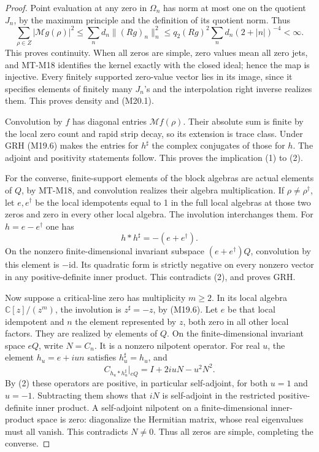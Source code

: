 \begin{proof}
Point evaluation at any zero in \(\Omega_n\) has norm at
most one on the quotient \(J_n\), by the maximum principle
and the definition of its quotient norm. Thus
\[
 \sum_{\rho\in Z}|\mathcal Mg(\rho)|^2
 \le\sum_n d_n\|(Rg)_n\|_n^2
 \le q_2(Rg)^2\sum_n d_n(2+|n|)^{-4}<\infty.           \tag{M20.2}
\]
This proves continuity. When all zeros are simple, zero
values mean all zero jets, and MT-M18 identifies the kernel
exactly with the closed ideal; hence the map is injective.
Every finitely supported zero-value vector lies in its
image, since it specifies elements of finitely many
\(J_n\)'s and the interpolation right inverse realizes
them. This proves density and (M20.1).

Convolution by \(f\) has diagonal entries
\(\mathcal Mf(\rho)\). Their absolute sum is finite by
the local zero count and rapid strip decay, so its extension
is trace class. Under GRH (M19.6) makes the entries for
\(h^\sharp\) the complex conjugates of those for \(h\).
The adjoint and positivity statements follow. This proves
the implication (1) to (2).

For the converse, finite-support elements of the block
algebras are actual elements of \(Q\), by MT-M18, and
convolution realizes their algebra multiplication. If
\(\rho\ne\rho^\dagger\), let \(e,e^\dagger\) be the
local idempotents equal to 1 in the full local algebras
at those two zeros and zero in every other local algebra.
The involution interchanges them. For \(h=e-e^\dagger\)
one has
\[
                  h*h^\sharp=-(e+e^\dagger).
\]
On the nonzero finite-dimensional invariant subspace
\((e+e^\dagger)Q\), convolution by this element is
\(-\mathrm{id}\). Its quadratic form is strictly negative
on every nonzero vector in any positive-definite inner
product. This contradicts (2), and proves GRH.

Now suppose a critical-line zero has multiplicity
\(m\ge2\). In its local algebra
\(\mathbb C[z]/(z^m)\), the involution is
\(z^\sharp=-z\), by (M19.6). Let \(e\) be that local
idempotent and \(n\) the element represented by \(z\),
both zero in all other local factors. They are realized
by elements of \(Q\). On the finite-dimensional invariant
space \(eQ\), write \(N=C_n\). It is a nonzero nilpotent
operator. For real \(u\), the element \(h_u=e+iun\)
satisfies \(h_u^\sharp=h_u\), and
\[
 C_{h_u*h_u^\sharp}|_{eQ}
                     =I+2iuN-u^2N^2.                \tag{M20.3}
\]
By (2) these operators are positive, in particular
self-adjoint, for both \(u=1\) and \(u=-1\).
Subtracting them shows that \(iN\) is self-adjoint
in the restricted positive-definite inner product.
A self-adjoint nilpotent on a finite-dimensional
inner-product space is zero: diagonalize the Hermitian
matrix, whose real eigenvalues must all vanish.
This contradicts \(N\ne0\). Thus all zeros are simple,
completing the converse.
\end{proof}

